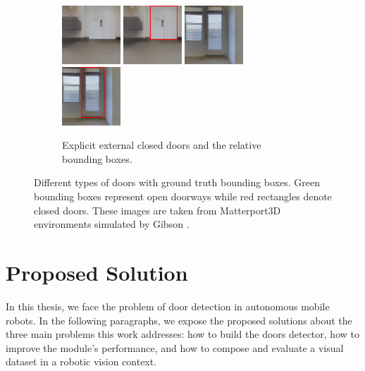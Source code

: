 \begin{figure}[h!]
	\begin{subfigure}[b]{\linewidth}
		\centering
		\includegraphics[width=0.24\textwidth]{images/explicitexternalclosed1.png}
		\hfill
		\includegraphics[width=0.24\textwidth]{images/explicitexternalclosed1boxed.png}
		\hfill
		\includegraphics[width=0.24\textwidth]{images/explicitexternalclosed2.png}
		\hfill
		\includegraphics[width=0.24\textwidth]{images/explicitexternalclosed2boxed.png}
		\caption{Explicit external closed doors and the relative bounding boxes.}
	\end{subfigure}
	\caption{Different types of doors with ground truth bounding boxes. Green bounding boxes represent open doorways while red rectangles denote closed doors. These images are taken from Matterport3D \cite{matterport} environments simulated by Gibson \cite{gibson}.}
\end{figure}

\section{Proposed Solution}
\label{sec:solution}
In this thesis, we face the problem of door detection in autonomous mobile robots. In the following paragraphs, we expose the proposed solutions about the three main problems this work addresses: how to build the doors detector, how to improve the module's performance, and how to compose and evaluate a visual dataset in a robotic vision context.

